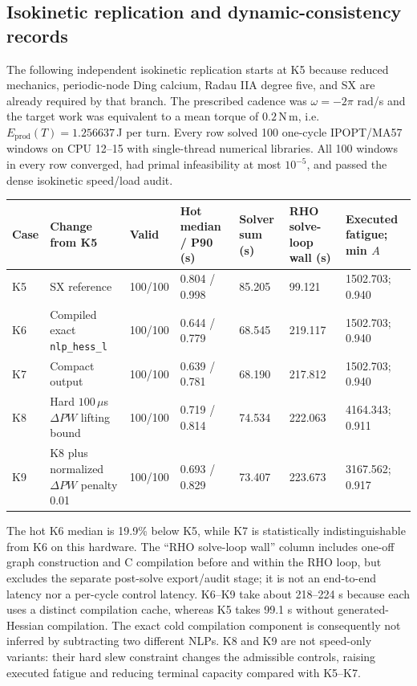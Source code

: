 \documentclass[10pt]{article}
\begin{document}
\subsection{Isokinetic replication and dynamic-consistency records}

The following independent isokinetic replication starts at K5 because reduced mechanics, periodic-node Ding calcium, Radau IIA degree five, and SX are already required by that branch. The prescribed cadence was $\omega=-2\pi$ rad/s and the target work was equivalent to a mean torque of $0.2\,$N\,m, i.e. $E_{\mathrm{prod}}(T)=1.256637\,$J per turn. Every row solved 100 one-cycle IPOPT/MA57 windows on CPU 12--15 with single-thread numerical libraries. All 100 windows in every row converged, had primal infeasibility at most $10^{-5}$, and passed the dense isokinetic speed/load audit.

\begin{longtable}{@{}p{}p{}p{}p{}p{}p{}p{}@{}}
\toprule
Case & Change from K5 & Valid & Hot median / P90 (s) & Solver sum (s) & RHO solve-loop wall (s) & Executed fatigue; min $A$\\
\midrule
\endhead
K5 & SX reference & 100/100 & 0.804 / 0.998 & 85.205 & 99.121 & 1502.703; 0.940\\
K6 & Compiled exact \texttt{nlp\_hess\_l} & 100/100 & 0.644 / 0.779 & 68.545 & 219.117 & 1502.703; 0.940\\
K7 & Compact output & 100/100 & 0.639 / 0.781 & 68.190 & 217.812 & 1502.703; 0.940\\
K8 & Hard $100\,\mu$s $\Delta PW$ lifting bound & 100/100 & 0.719 / 0.814 & 74.534 & 222.063 & 4164.343; 0.911\\
K9 & K8 plus normalized $\Delta PW$ penalty 0.01 & 100/100 & 0.693 / 0.829 & 73.407 & 223.673 & 3167.562; 0.917\\
\bottomrule
\end{longtable}

The hot K6 median is 19.9\% below K5, while K7 is statistically indistinguishable from K6 on this hardware. The “RHO solve-loop wall” column includes one-off graph construction and C compilation before and within the RHO loop, but excludes the separate post-solve export/audit stage; it is not an end-to-end latency nor a per-cycle control latency. K6--K9 take about 218--224 s because each uses a distinct compilation cache, whereas K5 takes 99.1 s without generated-Hessian compilation. The exact cold compilation component is consequently not inferred by subtracting two different NLPs. K8 and K9 are not speed-only variants: their hard slew constraint changes the admissible controls, raising executed fatigue and reducing terminal capacity compared with K5--K7.
\end{document}
